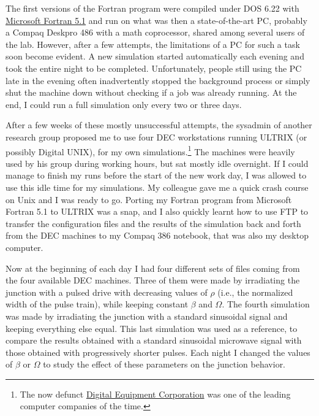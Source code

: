 The first versions of the Fortran program were compiled under DOS 6.22 with \href{https://winworldpc.com/product/microsoft-fortran/5x}{Microsoft Fortran 5.1} and run on what was then a state-of-the-art PC, probably a Compaq Deskpro 486 with a math coprocessor, shared among several users of the lab. 
However, after a few attempts, the limitations of a PC for such a task soon become evident.
A new simulation started automatically each evening and took the entire night to be completed. Unfortunately, people still using the PC late in the evening often inadvertently stopped the background process or simply shut the machine down without checking if a job was already running. 
At the end, I could run a full simulation only every two or three days.

After a few weeks of these mostly unsuccessful attempts, the sysadmin of another research group proposed me to use four DEC workstations running ULTRIX (or possibly Digital UNIX), for my own simulations.\footnote{The now defunct \href{https://en.wikipedia.org/wiki/Digital_Equipment_Corporation}{Digital Equipment Corporation} was one of the leading computer companies of the time.}
The machines were heavily used by his group during working hours, but sat mostly idle overnight. If I could manage to finish my runs before the start of the new work day, I was allowed to use this idle time for my simulations.
My colleague gave me a quick crash course on Unix and I was ready to go.
Porting my Fortran program from Microsoft Fortran 5.1 to ULTRIX was a snap, and I also quickly learnt how to use FTP to transfer the configuration files and the results of the simulation back and forth from the DEC machines to my Compaq 386 notebook, that was also my desktop computer.

Now at the beginning of each day I had four different sets of files coming from the four available DEC machines. Three of them were made by irradiating the junction with a pulsed drive with decreasing values of $\rho$ (i.e., the normalized width of the pulse train), while keeping constant $\beta$ and $\Omega$.
The fourth simulation was made by irradiating the junction with a standard sinusoidal signal and keeping everything else equal. This last simulation was used as a reference, to compare the results obtained with a standard sinusoidal microwave signal with those obtained with progressively shorter pulses.
Each night I changed the values of $\beta$ or $\Omega$ to study the effect of these parameters on the junction behavior.

